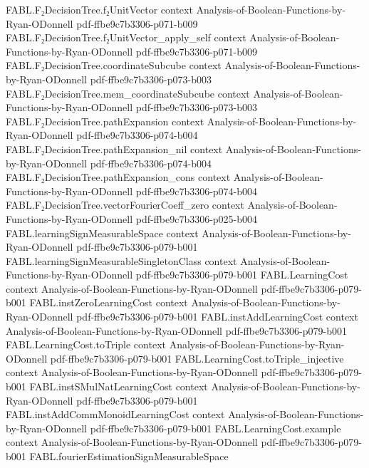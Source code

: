 \begin{theorem}
\proofstep
  {FABL.F₂DecisionTree.f₂UnitVector}
  {context}
  {Analysis-of-Boolean-Functions-by-Ryan-ODonnell}
  {pdf-ffbe9c7b3306-p071-b009}
\proofstep
  {FABL.F₂DecisionTree.f₂UnitVector_apply_self}
  {context}
  {Analysis-of-Boolean-Functions-by-Ryan-ODonnell}
  {pdf-ffbe9c7b3306-p071-b009}
\proofstep
  {FABL.F₂DecisionTree.coordinateSubcube}
  {context}
  {Analysis-of-Boolean-Functions-by-Ryan-ODonnell}
  {pdf-ffbe9c7b3306-p073-b003}
\proofstep
  {FABL.F₂DecisionTree.mem_coordinateSubcube}
  {context}
  {Analysis-of-Boolean-Functions-by-Ryan-ODonnell}
  {pdf-ffbe9c7b3306-p073-b003}
\proofstep
  {FABL.F₂DecisionTree.pathExpansion}
  {context}
  {Analysis-of-Boolean-Functions-by-Ryan-ODonnell}
  {pdf-ffbe9c7b3306-p074-b004}
\proofstep
  {FABL.F₂DecisionTree.pathExpansion_nil}
  {context}
  {Analysis-of-Boolean-Functions-by-Ryan-ODonnell}
  {pdf-ffbe9c7b3306-p074-b004}
\proofstep
  {FABL.F₂DecisionTree.pathExpansion_cons}
  {context}
  {Analysis-of-Boolean-Functions-by-Ryan-ODonnell}
  {pdf-ffbe9c7b3306-p074-b004}
\proofstep
  {FABL.F₂DecisionTree.vectorFourierCoeff_zero}
  {context}
  {Analysis-of-Boolean-Functions-by-Ryan-ODonnell}
  {pdf-ffbe9c7b3306-p025-b004}
\proofstep
  {FABL.learningSignMeasurableSpace}
  {context}
  {Analysis-of-Boolean-Functions-by-Ryan-ODonnell}
  {pdf-ffbe9c7b3306-p079-b001}
\proofstep
  {FABL.learningSignMeasurableSingletonClass}
  {context}
  {Analysis-of-Boolean-Functions-by-Ryan-ODonnell}
  {pdf-ffbe9c7b3306-p079-b001}
\proofstep
  {FABL.LearningCost}
  {context}
  {Analysis-of-Boolean-Functions-by-Ryan-ODonnell}
  {pdf-ffbe9c7b3306-p079-b001}
\proofstep
  {FABL.instZeroLearningCost}
  {context}
  {Analysis-of-Boolean-Functions-by-Ryan-ODonnell}
  {pdf-ffbe9c7b3306-p079-b001}
\proofstep
  {FABL.instAddLearningCost}
  {context}
  {Analysis-of-Boolean-Functions-by-Ryan-ODonnell}
  {pdf-ffbe9c7b3306-p079-b001}
\proofstep
  {FABL.LearningCost.toTriple}
  {context}
  {Analysis-of-Boolean-Functions-by-Ryan-ODonnell}
  {pdf-ffbe9c7b3306-p079-b001}
\proofstep
  {FABL.LearningCost.toTriple_injective}
  {context}
  {Analysis-of-Boolean-Functions-by-Ryan-ODonnell}
  {pdf-ffbe9c7b3306-p079-b001}
\proofstep
  {FABL.instSMulNatLearningCost}
  {context}
  {Analysis-of-Boolean-Functions-by-Ryan-ODonnell}
  {pdf-ffbe9c7b3306-p079-b001}
\proofstep
  {FABL.instAddCommMonoidLearningCost}
  {context}
  {Analysis-of-Boolean-Functions-by-Ryan-ODonnell}
  {pdf-ffbe9c7b3306-p079-b001}
\proofstep
  {FABL.LearningCost.example}
  {context}
  {Analysis-of-Boolean-Functions-by-Ryan-ODonnell}
  {pdf-ffbe9c7b3306-p079-b001}
\proofstep
  {FABL.fourierEstimationSignMeasurableSpace}

\end{theorem}
